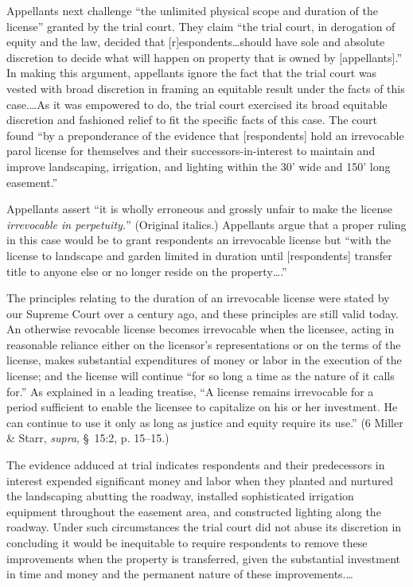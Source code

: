 Appellants next challenge ``the unlimited physical scope and duration of the
license'' granted by the trial court. They claim ``the trial court, in
derogation of equity and the law, decided that [r]espondents\ldots should have
sole and absolute discretion to decide what will happen on property that is
owned by [appellants].'' In making this argument, appellants ignore the fact
that the trial court was vested with broad discretion in framing an equitable
result under the facts of this case.\ldots As it was empowered to do, the trial
court exercised its broad equitable discretion and fashioned relief to fit the
specific facts of this case. The court found ``by a preponderance of the
evidence that [respondents] hold an irrevocable parol license for themselves and
their successors-in-interest to maintain and improve landscaping, irrigation,
and lighting within the 30' wide and 150' long easement.''

Appellants assert ``it is wholly erroneous and grossly unfair to make the
license \textit{irrevocable in perpetuity.}'' (Original italics.) Appellants
argue that a proper ruling in this case would be to grant respondents an
irrevocable license but ``with the license to landscape and garden limited in
duration until [respondents] transfer title to anyone else or no longer reside
on the property\ldots.''

The principles relating to the duration of an irrevocable license were stated by
our Supreme Court over a century ago, and these principles are still valid
today. An otherwise revocable license becomes irrevocable when the licensee,
acting in reasonable reliance either on the licensor's representations or on the
terms of the license, makes substantial expenditures of money or labor in the
execution of the license; and the license will continue ``for so long a time as
the nature of it calls for.'' As explained in a leading treatise, ``A license
remains irrevocable for a period sufficient to enable the licensee to capitalize
on his or her investment. He can continue to use it only as long as justice and
equity require its use.'' (6 Miller \& Starr, \textit{supra},  \S~15:2, p.
15--15.)

The evidence adduced at trial indicates respondents and their predecessors in
interest expended significant money and labor when they planted and nurtured the
landscaping abutting the roadway, installed sophisticated irrigation equipment
throughout the easement area, and constructed lighting along the roadway. Under
such circumstances the trial court did not abuse its discretion in concluding it
would be inequitable to require respondents to remove these improvements when
the property is transferred, given the substantial investment in time and money
and the permanent nature of these improvements.\dots

